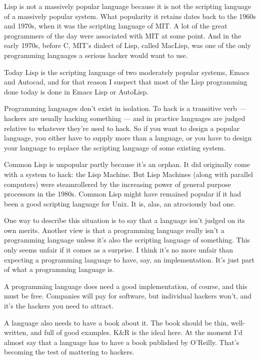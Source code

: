 \documentclass[12pt]{book}
\begin{document}
Lisp is not a massively popular language because it is not the scripting
language of a massively popular system. What popularity it retains dates
back to the 1960s and 1970s, when it was the scripting language of MIT.
A lot of the great programmers of the day were associated with MIT at
some point. And in the early 1970s, before C, MIT's dialect of Lisp,
called MacLisp, was one of the only programming languages a serious
hacker would want to use.

Today Lisp is the scripting language of two moderately popular systems,
Emacs and Autocad, and for that reason I suspect that most of the Lisp
programming done today is done in Emacs Lisp or AutoLisp.

Programming languages don't exist in isolation. To hack is a transitive
verb --- hackers are usually hacking something --- and in practice
languages are judged relative to whatever they're used to hack. So if
you want to design a popular language, you either have to supply more
than a language, or you have to design your language to replace the
scripting language of some existing system.

Common Lisp is unpopular partly because it's an orphan. It did
originally come with a system to hack: the Lisp Machine. But Lisp
Machines (along with parallel computers) were steamrollered by the
increasing power of general purpose processors in the 1980s. Common Lisp
might have remained popular if it had been a good scripting language for
Unix. It is, alas, an atrociously bad one.

One way to describe this situation is to say that a language isn't
judged on its own merits. Another view is that a programming language
really isn't a programming language unless it's also the scripting
language of something. This only seems unfair if it comes as a surprise.
I think it's no more unfair than expecting a programming language to
have, say, an implementation. It's just part of what a programming
language is.

A programming language does need a good implementation, of course, and
this must be free. Companies will pay for software, but individual
hackers won't, and it's the hackers you need to attract.

A language also needs to have a book about it. The book should be thin,
well-written, and full of good examples. K\&R is the ideal here. At the
moment I'd almost say that a language has to have a book published by
O'Reilly. That's becoming the test of mattering to hackers.
\end{document}
